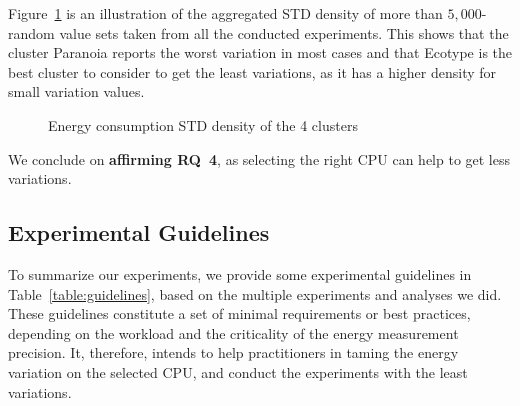 Figure~\ref{fig:cpugen} is an illustration of the aggregated STD density of more than $5,000$-random value sets taken from all the conducted experiments.
This shows that the cluster \textsf{Paranoia} reports the worst variation in most cases and that \textsf{Ecotype} is the best cluster to consider to get the least variations, as it has a higher density for small variation values.

\begin{figure}
    \caption{Energy consumption STD density of the 4 clusters}\label{fig:cpugen}
\end{figure}

\begin{mdframed}[skipabove=\topsep,skipbelow=\topsep]
    We conclude on \textbf{affirming \textsc{RQ}~4}, as selecting the right CPU can help to get less variations.
\end{mdframed}


\subsection{Experimental Guidelines}
To summarize our experiments, we provide some experimental guidelines in Table~\ref{table:guidelines}, based on the multiple experiments and analyses we did.
These guidelines constitute a set of minimal requirements or best practices, depending on the workload and the criticality of the energy measurement precision.
It, therefore, intends to help practitioners in taming the energy variation on the selected CPU, and conduct the experiments with the least variations.

